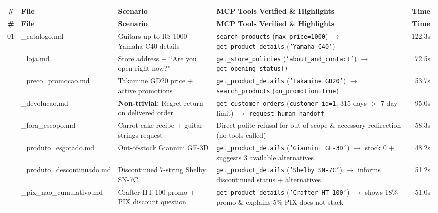\documentclass[11pt,a4paper]{article}
\begin{document}
\begingroup
\footnotesize
\setlength{\tabcolsep}{3.5pt}
\begin{longtable}{c >{\ttfamily\raggedright\arraybackslash}p{3.5cm} >{\raggedright\arraybackslash}p{3.8cm} >{\raggedright\arraybackslash}p{6.5cm} r}
\toprule
\textbf{\#} & \textbf{\normalfont\bfseries File} & \textbf{Scenario} & \textbf{MCP Tools Verified \& Highlights} & \textbf{Time} \\
\midrule
\endfirsthead
\toprule
\textbf{\#} & \textbf{\normalfont\bfseries File} & \textbf{Scenario} & \textbf{MCP Tools Verified \& Highlights} & \textbf{Time} \\
\midrule
\endhead
01 & 01\_catalogo.md & Guitars up to R\$ 1000 + Yamaha C40 details & \texttt{search\_products} (\texttt{max\_price=1000}) $\rightarrow$ \texttt{get\_product\_details} (\texttt{'Yamaha C40'}) & 122.3s \\
\addlinespace[2pt]
02 & 02\_loja.md & Store address + ``Are you open right now?'' & \texttt{get\_store\_policies} (\texttt{'about\_and\_contact'}) $\rightarrow$ \texttt{get\_opening\_status()} & 72.5s \\
\addlinespace[2pt]
03 & 03\_preco\_\allowbreak promocao.md & Takamine GD20 price + active promotions & \texttt{get\_product\_details} (\texttt{'Takamine GD20'}) $\rightarrow$ \texttt{search\_products} (\texttt{on\_promotion=True}) & 53.7s \\
\addlinespace[2pt]
04 & 04\_devolucao.md & \textbf{Non-trivial:} Regret return on delivered order & \texttt{get\_customer\_orders} (\texttt{customer\_id=1}, 315 days $>$ 7-day limit) $\rightarrow$ \texttt{request\_human\_handoff} & 95.0s \\
\addlinespace[2pt]
05 & 05\_fora\_escopo.md & Carrot cake recipe + guitar strings request & Direct polite refusal for out-of-scope \& accessory redirection (no tools called) & 58.3s \\
\addlinespace[2pt]
06 & 06\_produto\_\newline esgotado.md & Out-of-stock Giannini GF-3D & \texttt{get\_product\_details} (\texttt{'Giannini GF-3D'}) $\rightarrow$ stock 0 + suggests 3 available alternatives & 48.2s \\
\addlinespace[2pt]
07 & 07\_produto\_\newline descontinuado.md & Discontinued 7-string Shelby SN-7C & \texttt{get\_product\_details} (\texttt{'Shelby SN-7C'}) $\rightarrow$ informs discontinued status + alternatives & 51.2s \\
\addlinespace[2pt]
08 & 08\_pix\_nao\_\newline cumulativo.md & Crafter HT-100 promo + PIX discount question & \texttt{get\_product\_details} (\texttt{'Crafter HT-100'}) $\rightarrow$ shows 18\% promo \& explains 5\% PIX does not stack & 51.0s \\

\end{longtable}
\end{document}
